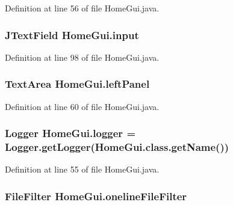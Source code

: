 Definition at line 56 of file Home\-Gui.\-java.

\hypertarget{class_home_gui_ab33ea273ae2f2c5bde32041076af630c}{
\subsubsection[{input}]{\setlength{\rightskip}{0pt plus 5cm}J\-Text\-Field {\bf Home\-Gui.\-input}}}\label{class_home_gui_ab33ea273ae2f2c5bde32041076af630c}


Definition at line 98 of file Home\-Gui.\-java.

\hypertarget{class_home_gui_ac6ba89ab2c3204e87ec00b9b4962f327}{
\subsubsection[{left\-Panel}]{\setlength{\rightskip}{0pt plus 5cm}Text\-Area {\bf Home\-Gui.\-left\-Panel}}}\label{class_home_gui_ac6ba89ab2c3204e87ec00b9b4962f327}


Definition at line 60 of file Home\-Gui.\-java.

\hypertarget{class_home_gui_a6eef831dc2ff4533740f3395c4b9067a}{
\subsubsection[{logger}]{\setlength{\rightskip}{0pt plus 5cm}Logger {\bf Home\-Gui.\-logger} = Logger.\-get\-Logger(Home\-Gui.\-class.\-get\-Name())}}\label{class_home_gui_a6eef831dc2ff4533740f3395c4b9067a}


Definition at line 55 of file Home\-Gui.\-java.

\hypertarget{class_home_gui_a8b0192c597368a34c855abe70a8a80ec}{
\subsubsection[{oneline\-File\-Filter}]{\setlength{\rightskip}{0pt plus 5cm}File\-Filter {\bf Home\-Gui.\-oneline\-File\-Filter}}}\label{class_home_gui_a8b0192c597368a34c855abe70a8a80ec}


